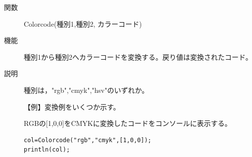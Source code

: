 \documentclass[papersize,a4paper,12pt,uplatex]{jsarticle}
\begin{document}
\begin{description}

\hypertarget{colorcode}{}
\item[関数]Colorcode(種別1,種別2, カラーコード)
\item[機能]種別1から種別2へカラーコードを変換する。戻り値は変換されたコード。
\item[説明]種別は，"rgb","cmyk","hsv"のいずれか。

\vspace{\baselineskip}
【例】変換例をいくつか示す。

RGBの[1,0,0]をCMYKに変換したコードをコンソールに表示する。
\begin{verbatim}
col=Colorcode("rgb","cmyk",[1,0,0]); 
println(col); 
\end{verbatim}


\end{description}
\end{document}
